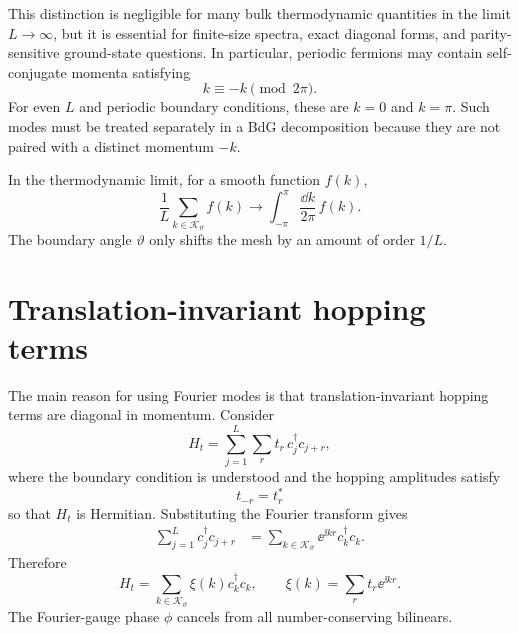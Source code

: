 This distinction is negligible for many bulk thermodynamic quantities in the
limit $L\to\infty$, but it is essential for finite-size spectra, exact diagonal
forms, and parity-sensitive ground-state questions.  In particular, periodic
fermions may contain self-conjugate momenta satisfying
\begin{equation}
    k\equiv -k\pmod{2\pi}.
\end{equation}
For even $L$ and periodic boundary conditions, these are $k=0$ and $k=\pi$.  Such
modes must be treated separately in a BdG decomposition because they are not paired
with a distinct momentum $-k$.

In the thermodynamic limit, for a smooth function $f(k)$,
\begin{equation}
\label{eq:thermodynamic-limit-momentum-sum}
    \frac{1}{L}\sum_{k\in\mathcal{K}_\vartheta}f(k)
    \longrightarrow
    \int_{-\pi}^{\pi}\frac{\dd k}{2\pi}\,f(k).
\end{equation}
The boundary angle $\vartheta$ only shifts the mesh by an amount of order $1/L$.

\section{Translation-invariant hopping terms}

The main reason for using Fourier modes is that translation-invariant hopping
terms are diagonal in momentum.  Consider
\begin{equation}
\label{eq:translation-invariant-hopping-real-space}
    H_t
    =
    \sum_{j=1}^{L}\sum_{r}t_r\,c_j^\dagger c_{j+r},
\end{equation}
where the boundary condition is understood and the hopping amplitudes satisfy
\begin{equation}
    t_{-r}=t_r^*
\end{equation}
so that $H_t$ is Hermitian.  Substituting the Fourier transform gives
\begin{align}
    \sum_{j=1}^{L}c_j^\dagger c_{j+r}
    &=
    \sum_{k\in\mathcal{K}_\vartheta}
    \ee^{\ii k r}c_k^\dagger c_k.
\end{align}
Therefore
\begin{equation}
\label{eq:hopping-dispersion-general}
    H_t
    =
    \sum_{k\in\mathcal{K}_\vartheta}\xi(k)c_k^\dagger c_k,
    \qquad
    \xi(k)=\sum_{r}t_r\ee^{\ii k r}.
\end{equation}
The Fourier-gauge phase $\phi$ cancels from all number-conserving bilinears.


